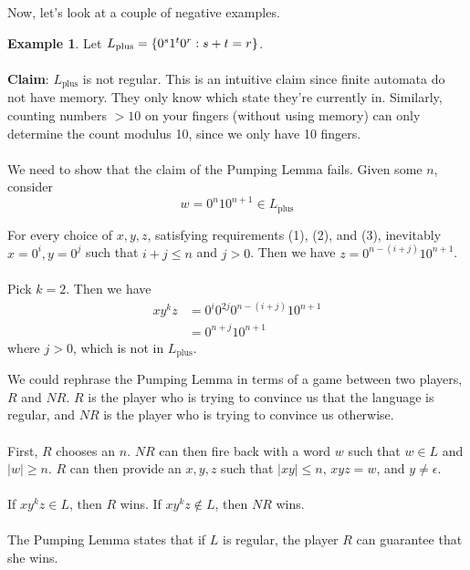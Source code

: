 \documentclass[]{article}
\DeclarePairedDelimiter{\set}{\lbrace}{\rbrace}
\theoremstyle{definition}
\newtheorem{ex}{Example}[section]
\begin{document}
        Now, let's look at a couple of negative examples.
        \begin{ex}
          Let $L_\text{plus} = \set{0^s 1^t 0^r : s + t = r}$.
          \\ \\
          \textbf{Claim}: $L_\text{plus}$ is not regular. This is an intuitive claim since finite automata do not have memory. They only know which state they're currently in. Similarly, counting numbers $> 10$ on your fingers (without using memory) can only determine the count modulus 10, since we only have 10 fingers.
          \\ \\
          We need to show that the claim of the Pumping Lemma fails. Given some $n$, consider
          $$
            w = 0^n 1 0^{n + 1} \in L_\text{plus}
          $$

          For every choice of $x, y, z$, satisfying requirements (1), (2), and (3), inevitably $x = 0^i, y = 0^j$ such that $i+j \le n$ and $j > 0$. Then we have $z = 0^{n - (i + j)} 1 0^{n + 1}$.
          \\ \\
          Pick $k = 2$. Then we have
          \begin{align*}
            xy^kz &= 0^i 0^{2j} 0^{n - (i + j)} 1 0^{n + 1} \\
            &= 0^{n + j} 1 0^{n + 1}
          \end{align*}
          where $j > 0$, which is not in $L_\text{plus}$.
        \end{ex}

        We could rephrase the Pumping Lemma in terms of a game between two players, $R$ and $NR$. $R$ is the player who is trying to convince us that the language is regular, and $NR$ is the player who is trying to convince us otherwise.
        \\ \\
        First, $R$ chooses an $n$. $NR$ can then fire back with a word $w$ such that $w \in L$ and $|w| \ge n$. $R$ can then provide an $x, y, z$ such that $|xy| \le n$, $xyz = w$, and $y \ne \epsilon$.
        \\ \\
        If $xy^kz \in L$, then $R$ wins. If $xy^kz \not \in L$, then $NR$ wins.
        \\ \\
        The Pumping Lemma states that if $L$ is regular, the player $R$ can guarantee that she wins.
\end{document}
